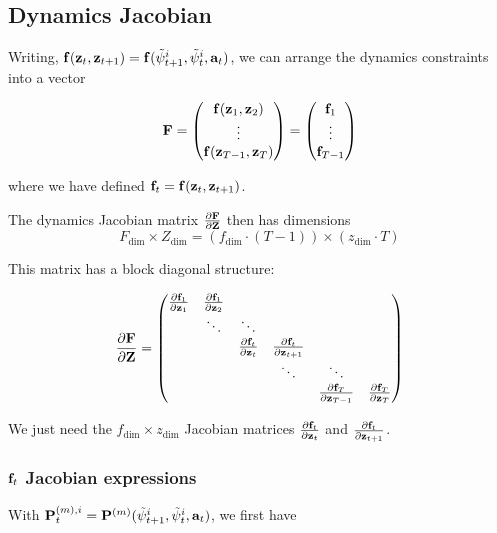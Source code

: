 \documentclass{article}
\newcommand{\isopsi}{\tilde \psi}
\begin{document}
\subsection{Dynamics Jacobian}

Writing, $\vb{f}(\vb{z}_{t}, \vb{z}_{t+1}) = \vb{f}(\isopsi^i_{t+1}, \isopsi^i_t, \vb{a}_t)$, we can arrange the dynamics constraints into a vector

\begin{equation}
  \vb{F} = \mqty(
    \vb{f}(\vb{z}_{1}, \vb{z}_{2}) \\
    \vdots \\
    \vb{f}(\vb{z}_{T-1}, \vb{z}_{T}) \\
  ) = \mqty(
    \vb{f}_1 \\
    \vdots \\
    \vb{f}_{T-1}
  )
\end{equation}

where we have defined $\vb{f}_t = \vb{f}(\vb{z}_t, \vb{z}_{t+1})$.

\hfill

The dynamics Jacobian matrix $\pdv{\vb{F}}{\vb{Z}}$ then has dimensions 
$$
F_{\dim} \times Z_{\dim} = (f_{\dim} \cdot (T-1)) \times (z_{\dim} \cdot T)
$$

This matrix has a block diagonal structure:

\begin{equation}
  \pdv{\vb{F}}{\vb{Z}} = \mqty(
    \pdv{\vb{f}_1}{\vb{z}_1} & \pdv{\vb{f}_1}{\vb{z}_2} & \\
    & \ddots & \ddots & \\
    & & \pdv{\vb{f}_t}{\vb{z}_t} & \pdv{\vb{f}_t}{\vb{z}_{t+1}} \\
    & & & \ddots & \ddots \\
    & & & & \pdv{\vb{f}_T}{\vb{z}_{T-1}} & \pdv{\vb{f}_T}{\vb{z}_{T}}
  )
\end{equation}

We just need the $f_{\dim} \times z_{\dim}$ Jacobian matrices $\pdv{\vb{f}_t}{\vb{z}_{t}}$ and $\pdv{\vb{f}_t}{\vb{z}_{t+1}}$.

\subsubsection*{$\vb{f}_t$ Jacobian expressions}

With $\vb{P}^{(m),i}_t = \vb{P}^{(m)}(\isopsi^i_{t+1}, \isopsi^i_{t}, \vb{a}_t)$, we first have
\end{document}
